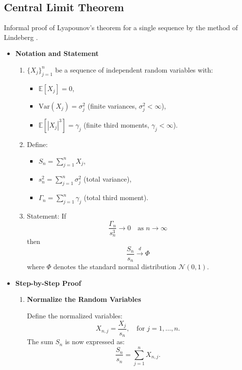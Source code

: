 \subsection{Central Limit Theorem}
Informal proof of Lyapounov's theorem for a single sequence by the method of Lindeberg \cite{chung2000course}.
\begin{itemize}
    \item \textbf{Notation and Statement}
    \begin{enumerate}
    \item \( \{X_j\}_{j=1}^n \) be a sequence of independent random variables with:
    \begin{itemize}
        \item[] \( \mathbb{E}[X_j] = 0 \), 
        \item[] \( \text{Var}(X_j) = \sigma_j^2 \) (finite variances, \( \sigma_j^2 < \infty \)),
        \item[] \( \mathbb{E}[|X_j|^3] = \gamma_j \) (finite third moments, \( \gamma_j < \infty \)).
    \end{itemize}

        \item Define:
        \begin{itemize}
            \item[] \( S_n = \sum_{j=1}^n X_j \),
            \item[] \( s_n^2 = \sum_{j=1}^n \sigma_j^2 \) (total variance),
            \item[] \( \Gamma_n = \sum_{j=1}^n \gamma_j \) (total third moment).
        \end{itemize}

        \item Statement:
    If 
    \[
   \frac{\Gamma_n}{s_n^3} \to 0 \quad \text{as } n \to \infty
   \]
   then 
   \[
   \frac{S_n}{s_n} \xrightarrow{d} \Phi
   \]
   where \( \Phi\) denotes the standard normal distribution \( \mathcal{N}(0,1) \).
   
    \end{enumerate}
    \item \textbf{Step-by-Step Proof}
    \begin{enumerate}
        \item \textbf{Normalize the Random Variables}
        
        Define the normalized variables:
\[
X_{n,j} = \frac{X_j}{s_n}, \quad \text{for } j = 1, \dots, n.
\]
The sum \( S_n \) is now expressed as:
\[
\frac{S_n}{s_n} = \sum_{j=1}^n X_{n,j}.
\]


\end{enumerate}
\end{itemize}
